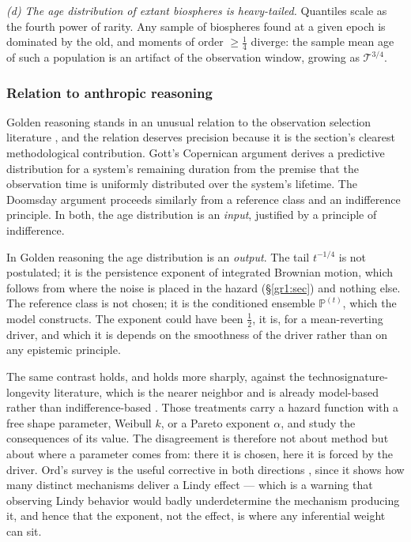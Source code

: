 \documentclass[11pt]{article}
\numberwithin{equation}{section}
\theoremstyle{plain}
\theoremstyle{definition}
\theoremstyle{remark}
\newcommand{\PP}{\mathbb{P}}
\begin{document}
\emph{(d) The age distribution of extant biospheres is heavy-tailed.}
Quantiles scale as the fourth power of rarity. Any sample of biospheres
found at a given epoch is dominated by the old, and moments of order
$\ge\tfrac14$ diverge: the sample mean age of such a population is an
artifact of the observation window, growing as $\mathcal T^{3/4}$.

\subsubsection{Relation to anthropic reasoning}\label{gr:subsub:anthropic}

Golden reasoning stands in an unusual relation to the observation
selection literature \cite{Car83,Got93,Bos02}, and the relation deserves precision because it is the section's clearest methodological
contribution. Gott's Copernican argument \cite{Got93} derives a predictive
distribution for a system's remaining duration from the premise that the
observation time is uniformly distributed over the system's lifetime.
The Doomsday argument \cite{Car83,Bos02} proceeds similarly from a
reference class and an indifference principle. In both, the age
distribution is an \emph{input}, justified by a principle of
indifference.

In Golden reasoning the age distribution is an \emph{output}. The tail
$t^{-1/4}$ is not postulated; it is the persistence exponent of
integrated Brownian motion, which follows from where the noise is placed
in the hazard (\S\ref{gr1:sec}) and nothing else. The reference class is not
chosen; it is the conditioned ensemble $\PP^{(t)}$, which the model
constructs. The exponent could have been $\tfrac12$, it is, for a
mean-reverting driver, and which it is depends on the smoothness of
the driver rather than on any epistemic principle.

The same contrast holds, and holds more sharply, against the
technosignature-longevity literature, which is the nearer neighbor and
is already model-based rather than indifference-based
\cite{BC21,BG24,Kip20}. Those treatments carry a hazard function with a
free shape parameter, Weibull $k$, or a Pareto exponent $\alpha$, and study the consequences of its value. The disagreement is therefore
not about method but about where a parameter comes from: there it is
chosen, here it is forced by the driver. Ord's survey is the useful
corrective in both directions \cite{Ord23}, since it shows how many
distinct mechanisms deliver a Lindy effect --- which is a warning that
observing Lindy behavior would badly underdetermine the mechanism
producing it, and hence that the exponent, not the effect, is where any
inferential weight can sit.
\end{document}
